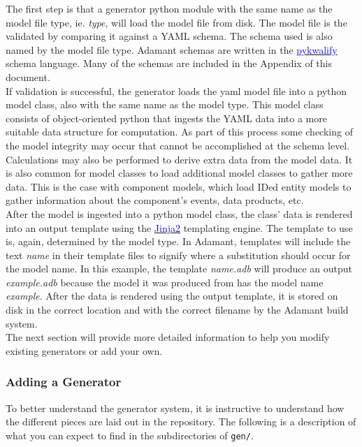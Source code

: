 The first step is that a generator python module with the same name as the model file type, ie. \textit{type}, will load the model file from disk. The model file is the validated by comparing it against a YAML schema. The schema used is also named by the model file type. Adamant schemas are written in the \href{https://pykwalify.readthedocs.io/en/unstable/}{\textcolor{blue}{pykwalify}} schema language. Many of the schemas are included in the Appendix of this document. \\

If validation is successful, the generator loads the yaml model file into a python model class, also with the same name as the model type. This model class consists of object-oriented python that ingests the YAML data into a more suitable data structure for computation. As part of this process some checking of the model integrity may occur that cannot be accomplished at the schema level. Calculations may also be performed to derive extra data from the model data. It is also common for model classes to load additional model classes to gather more data. This is the case with component models, which load IDed entity models to gather information about the component's events, data products, etc. \\

After the model is ingested into a python model class, the class' data is rendered into an output template using the \href{http://jinja.pocoo.org}{\textcolor{blue}{Jinja2}} templating engine. The template to use is, again, determined by the model type. In Adamant, templates will include the text \textit{name} in their template files to signify where a substitution should occur for the model name. In this example, the template \textit{name.adb} will produce an output \textit{example.adb} because the model it was produced from has the model name \textit{example}. After the data is rendered using the output template, it is stored on disk in the correct location and with the correct filename by the Adamant build system. \\

The next section will provide more detailed information to help you modify existing generators or add your own.

\subsubsection{Adding a Generator} \label{Adding Generators}

To better understand the generator system, it is instructive to understand how the different pieces are laid out in the repository. The following is a description of what you can expect to find in the subdirectories of \texttt{gen/}.

